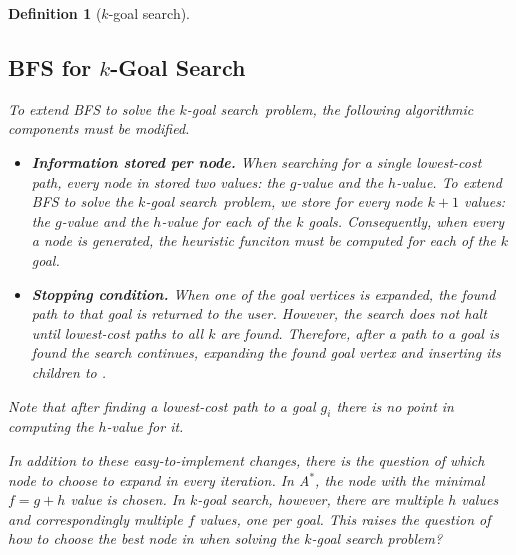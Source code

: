 \documentclass{aicom2e}
\newtheorem{definition}{Definition}
\newcommand{\kgs}{$k$-goal search}
\newcommand{\astar}{A$^*$}
\begin{document}
\begin{definition}[$k$-goal search]
\subsection{BFS for $k$-Goal Search}
\begin{algorithm}[t!]
\begin{footnotesize}
\SetAlgoLined {}  \caption{Best-First Search} \label{alg:bfs}
\end{footnotesize}
\end{algorithm}
To extend BFS to solve the \kgs\ problem, the following algorithmic components 
must be modified. 
\begin{itemize}
    \item {\bf Information stored per node.} When searching for a single lowest-cost path, every node in \open{} stored two values: the $g$-value and the $h$-value. To extend BFS to solve the \kgs\ problem, we store for every node $k+1$ values: the $g$-value and the $h$-value for each of the $k$ goals. Consequently, when every a node is generated, the heuristic funciton must be computed for each of the $k$ goal.
    \item {\bf Stopping condition.} When one of the goal vertices is expanded, the found path to that goal is returned to the user. However, the search does not halt until lowest-cost paths to all $k$ are found. Therefore, after a path to a goal is found the search continues, expanding the found goal vertex and inserting its children to \open{}. 
\end{itemize}
Note that after finding a lowest-cost path to a goal $g_i$ there is no point in
computing the $h$-value for it. 

In addition to these easy-to-implement changes, there is the question of which node to choose to expand in every iteration. In \astar{}, the node with the minimal $f=g+h$ value is chosen. 
In \kgs{}, however, there are multiple $h$ values and correspondingly multiple $f$ values, one per goal. This raises the question of how to choose the best node in \open{}
 when solving the \kgs{} problem?
 

\end{definition}
\end{document}
